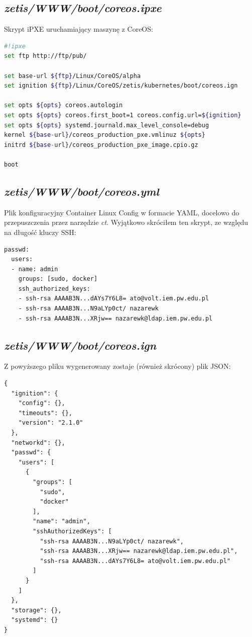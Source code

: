 \documentclass[a4paper,12pt,twoside,openany]{report}
\begin{document}
\newpage

\hypertarget{zetiswwwbootcoreos.ipxe}{%
\subsection{\texorpdfstring{\emph{zetis/WWW/boot/coreos.ipxe}}{zetis/WWW/boot/coreos.ipxe}}\label{zetiswwwbootcoreos.ipxe}}

Skrypt iPXE uruchamiający maszynę z CoreOS:

\begin{lstlisting}[language=bash]
#!ipxe
set ftp http://ftp/pub/

set base-url ${ftp}/Linux/CoreOS/alpha
set ignition ${ftp}/Linux/CoreOS/zetis/kubernetes/boot/coreos.ign

set opts ${opts} coreos.autologin
set opts ${opts} coreos.first_boot=1 coreos.config.url=${ignition}
set opts ${opts} systemd.journald.max_level_console=debug
kernel ${base-url}/coreos_production_pxe.vmlinuz ${opts}
initrd ${base-url}/coreos_production_pxe_image.cpio.gz

boot
\end{lstlisting}

\newpage

\hypertarget{zetiswwwbootcoreos.yml}{%
\subsection{\texorpdfstring{\emph{zetis/WWW/boot/coreos.yml}}{zetis/WWW/boot/coreos.yml}}\label{zetiswwwbootcoreos.yml}}

Plik konfiguracyjny Container Linux Config w formacie YAML, docelowo do
przepuszczenia przez narzędzie \emph{ct}. Wyjątkowo skróciłem ten
skrypt, ze względu na długość kluczy SSH:

\begin{lstlisting}
passwd:
  users:
  - name: admin
    groups: [sudo, docker]
    ssh_authorized_keys:
    - ssh-rsa AAAAB3N...dAYs7Y6L8= ato@volt.iem.pw.edu.pl
    - ssh-rsa AAAAB3N...N9aLYp0ct/ nazarewk
    - ssh-rsa AAAAB3N...XRjw== nazarewk@ldap.iem.pw.edu.pl
\end{lstlisting}

\hypertarget{zetiswwwbootcoreos.ign}{%
\subsection{\texorpdfstring{\emph{zetis/WWW/boot/coreos.ign}}{zetis/WWW/boot/coreos.ign}}\label{zetiswwwbootcoreos.ign}}

Z powyższego pliku wygenerowany zostaje (również skrócony) plik JSON:

\begin{lstlisting}
{
  "ignition": {
    "config": {},
    "timeouts": {},
    "version": "2.1.0"
  },
  "networkd": {},
  "passwd": {
    "users": [
      {
        "groups": [
          "sudo",
          "docker"
        ],
        "name": "admin",
        "sshAuthorizedKeys": [
          "ssh-rsa AAAAB3N...N9aLYp0ct/ nazarewk",
          "ssh-rsa AAAAB3N...XRjw== nazarewk@ldap.iem.pw.edu.pl",
          "ssh-rsa AAAAB3N...dAYs7Y6L8= ato@volt.iem.pw.edu.pl"
        ]
      }
    ]
  },
  "storage": {},
  "systemd": {}
}
\end{lstlisting}
\end{document}
